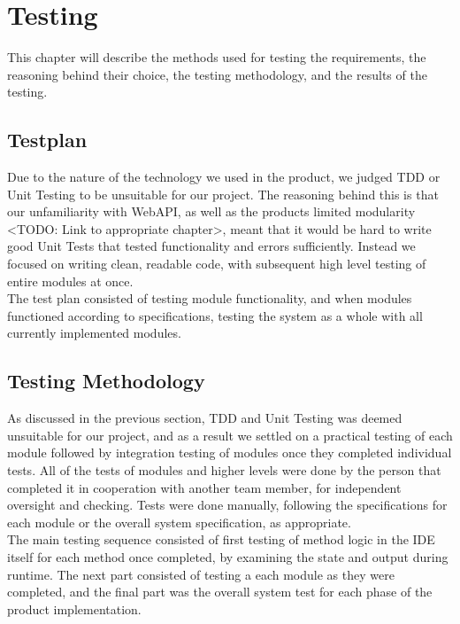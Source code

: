 \section{Testing}

This chapter will describe the methods used for testing the requirements, the reasoning behind their choice, the testing methodology, and the results of the testing.

\subsection{Testplan}

Due to the nature of the technology we used in the product, we judged TDD or Unit Testing to be unsuitable for our project. The reasoning behind this
is that our unfamiliarity with WebAPI, as well as the products limited modularity <TODO: Link to appropriate chapter>, meant that it would be hard to	%
write good Unit Tests that tested functionality and errors sufficiently. Instead we focused on writing clean, readable code, with subsequent high level testing
of entire modules at once.
\\
The test plan consisted of testing module functionality, and when modules functioned according to specifications, testing the system as a whole with all currently
implemented modules.

\subsection{Testing Methodology}

As discussed in the previous section, TDD and Unit Testing was deemed unsuitable for our project, and as a result we settled on a practical testing of each module
followed by integration testing of modules once they completed individual tests. All of the tests of modules and higher levels were done by the person that completed it
in cooperation with another team member, for independent oversight and checking. Tests were done manually, following the specifications for each module or the overall system
specification, as appropriate.
\\
The main testing sequence consisted of first testing of method logic in the IDE itself for each method once completed, by examining the state and output during runtime.
The next part consisted of testing a each module as they were completed, and the final part was the overall system test for each phase of the product implementation.

